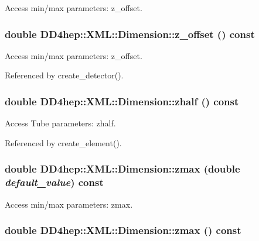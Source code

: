 Access min/max parameters: z\_\-offset. \hypertarget{struct_d_d4hep_1_1_x_m_l_1_1_dimension_aec12547de59daca99bca4ccfeef665c5}{
\subsubsection[{z\_\-offset}]{\setlength{\rightskip}{0pt plus 5cm}double DD4hep::XML::Dimension::z\_\-offset () const}}
\label{struct_d_d4hep_1_1_x_m_l_1_1_dimension_aec12547de59daca99bca4ccfeef665c5}


Access min/max parameters: z\_\-offset. 

Referenced by create\_\-detector().\hypertarget{struct_d_d4hep_1_1_x_m_l_1_1_dimension_af3d04e829a1235b14a281f4784d672b6}{
\subsubsection[{zhalf}]{\setlength{\rightskip}{0pt plus 5cm}double DD4hep::XML::Dimension::zhalf () const}}
\label{struct_d_d4hep_1_1_x_m_l_1_1_dimension_af3d04e829a1235b14a281f4784d672b6}


Access Tube parameters: zhalf. 

Referenced by create\_\-element().\hypertarget{struct_d_d4hep_1_1_x_m_l_1_1_dimension_a573dd0e45d8c96c04d439d3f3dff71c5}{
\subsubsection[{zmax}]{\setlength{\rightskip}{0pt plus 5cm}double DD4hep::XML::Dimension::zmax (double {\em default\_\-value}) const}}
\label{struct_d_d4hep_1_1_x_m_l_1_1_dimension_a573dd0e45d8c96c04d439d3f3dff71c5}


Access min/max parameters: zmax. \hypertarget{struct_d_d4hep_1_1_x_m_l_1_1_dimension_a02f670fff4ff1627a5899ff79573882d}{
\subsubsection[{zmax}]{\setlength{\rightskip}{0pt plus 5cm}double DD4hep::XML::Dimension::zmax () const}}
\label{struct_d_d4hep_1_1_x_m_l_1_1_dimension_a02f670fff4ff1627a5899ff79573882d}


